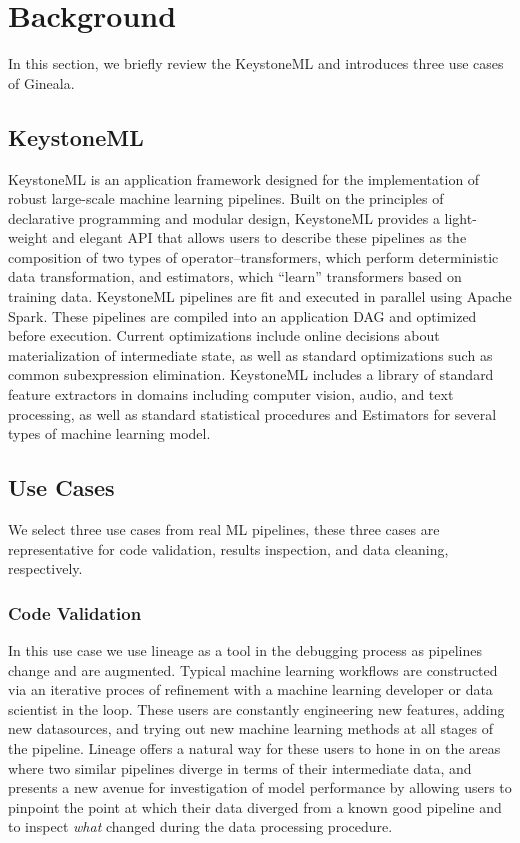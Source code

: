 \documentclass{sig-alternate}
\begin{document}
\section{Background}
\label{sec:Background}
In this section, we briefly review the KeystoneML and introduces three use cases of Gineala.

\subsection{KeystoneML}
KeystoneML is an application framework designed for the implementation of robust large-scale machine learning pipelines. Built on the principles of declarative programming and modular design, KeystoneML provides a light-weight and elegant API that allows users to describe these pipelines as the composition of two types of operator--transformers, which perform deterministic data transformation, and estimators, which ``learn'' transformers based on training data. KeystoneML pipelines are fit and executed in parallel using Apache Spark. These pipelines are compiled into an application DAG and optimized before execution. Current optimizations include online decisions about materialization of intermediate state, as well as standard optimizations such as common subexpression elimination. KeystoneML includes a library of standard feature extractors in domains including computer vision, audio, and text processing, as well as standard statistical procedures and Estimators for several types of machine learning model.

\subsection{Use Cases}
\label{sec:Back-cases}
We select three use cases from real ML pipelines, these three cases are representative for code validation, results inspection, and data cleaning, respectively.

\subsubsection{Code Validation}
In this use case we use lineage as a tool in the debugging process as pipelines change and are augmented. 
Typical machine learning workflows are constructed via an iterative proces of refinement with a machine learning developer or data scientist in the loop.
These users are constantly engineering new features, adding new datasources, and trying out new machine learning methods at all stages of the pipeline.
Lineage offers a natural way for these users to hone in on the areas where two similar pipelines diverge in terms of their intermediate data, and presents a new avenue for investigation of model performance by allowing users to pinpoint the point at which their data diverged from a known good pipeline and to inspect \emph{what} changed during the data processing procedure. 
\end{document}
